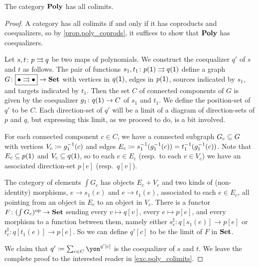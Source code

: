 \documentclass[Book-Poly]{subfiles}
\begin{document}
\begin{theorem}\label{thm.poly_colimits}
The category $\poly$ has all colimits.
\end{theorem}
\begin{proof}
A category has all colimits if and only if it has coproducts and coequalizers, so by \cref{prop.poly_coprods}, it suffices to show that $\poly$ has coequalizers.

Let $s,t \colon p \tto q$ be two maps of polynomials.
We construct the coequalizer $q'$ of $s$ and $t$ as follows.
The pair of functions $s_1, t_1 \colon p(\1) \tto q(\1)$ define a graph $G \colon \fbox{$\bullet\tto\bullet$} \to \smset$ with vertices in $q(\1)$, edges in $p(\1)$, sources indicated by $s_1$, and targets indicated by $t_1$.
Then the set $C$ of connected components of $G$ is given by the coequalizer $g_1 \colon q(\1) \to C$ of $s_1$ and $t_1$.
We define the position-set of $q'$ to be $C$.
Each direction-set of $q'$ will be a limit of a diagram of direction-sets of $p$ and $q$, but expressing this limit, as we proceed to do, is a bit involved.

For each connected component $c \in C$, we have a connected subgraph $G_c \ss G$ with vertices $V_c \coloneqq g_1\inv(c)$ and edges $E_c \coloneqq s_1\inv(g_1\inv(c)) = t_1\inv(g_1\inv(c))$.
Note that $E_c\ss p(\1)$ and $V_c\ss q(\1)$, so to each $e\in E_c$ (resp.\ to each $v\in V_c$) we have an associated direction-set $p[e]$ (resp.\ $q[v]$).

The category of elements $\int G_c$ has objects $E_c+V_c$ and two kinds of (non-identity) morphisms, $e \to s_1(e)$ and $e \to t_1(e)$, associated to each $e \in E_c$, all pointing from an object in $E_c$ to an object in $V_c$. %
There is a functor $F \colon (\int G_c)\op \to \smset$ sending every $v \mapsto q[v]$, every $e \mapsto p[e]$, and every morphism to a function between them, namely either $s^\sharp_e \colon q[s_1(e)] \to p[e]$ or $t^\sharp_e \colon q[t_1(e)] \to p[e]$.
So we can define $q'[c]$ to be the limit of $F$ in $\smset$.

We claim that $q'\coloneqq\sum_{c\in C}\yon^{q'[c]}$ is the coequalizer of $s$ and $t$. We leave the complete proof to the interested reader in \cref{exc.poly_colimits}.
\end{proof}
\end{document}
